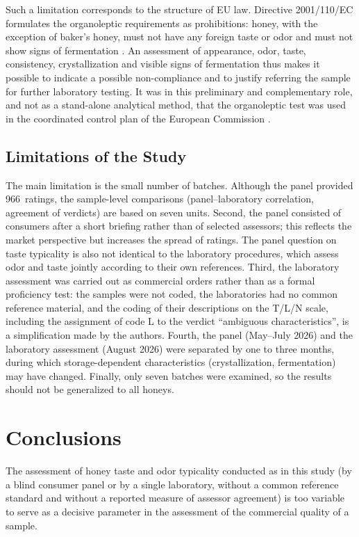 Such a limitation corresponds to the structure of EU law. Directive
2001/110/EC formulates the organoleptic requirements as prohibitions: honey,
with the exception of baker's honey, must not have any foreign taste or odor
and must not show signs of fermentation \cite{Dyrektywa2001110}. An assessment
of appearance, odor, taste, consistency, crystallization and visible signs of
fermentation thus makes it possible to indicate a possible non-compliance and
to justify referring the sample for further laboratory testing. It was in this
preliminary and complementary role, and not as a stand-alone analytical
method, that the organoleptic test was used in the coordinated control plan of
the European Commission \cite{KE2015PlanKontroli}.

\subsection{Limitations of the Study}
\label{sub:limitations}

The main limitation is the small number of batches. Although the panel
provided 966~ratings, the sample-level comparisons (panel--laboratory
correlation, agreement of verdicts) are based on seven units. Second, the
panel consisted of consumers after a short briefing rather than of selected
assessors; this reflects the market perspective but increases the spread of
ratings. The panel question on taste typicality is also not identical to the
laboratory procedures, which assess odor and taste jointly according to their
own references. Third, the laboratory assessment was carried out as commercial
orders rather than as a formal proficiency test: the samples were not coded,
the laboratories had no common reference material, and the coding of their
descriptions on the T/L/N scale, including the assignment of code L to the
verdict ``ambiguous characteristics'', is a simplification made by the
authors. Fourth, the panel (May--July 2026) and the laboratory assessment
(August 2026) were separated by one to three months, during which
storage-dependent characteristics (crystallization, fermentation) may have
changed. Finally, only seven batches were examined, so the results should not
be generalized to all honeys.

\section{Conclusions}

The assessment of honey taste and odor typicality conducted as in this study
(by a blind consumer panel or by a single laboratory, without a common
reference standard and without a reported measure of assessor agreement) is
too variable to serve as a decisive parameter in the assessment of the
commercial quality of a sample.

